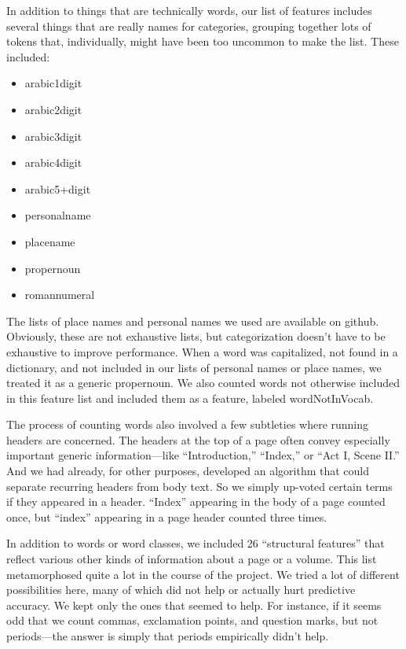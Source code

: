 \documentclass[paper=a4, fontsize=12pt]{scrartcl}
\numberwithin{equation}{section}		%
\numberwithin{figure}{section}			%
\numberwithin{table}{section}				%
\begin{document}
In addition to things that are technically words, our list of features includes several things that are really names for categories, grouping together lots of tokens that, individually, might have been too uncommon to make the list. These included:
\begin{itemize}
\item arabic1digit
\item arabic2digit
\item arabic3digit
\item arabic4digit
\item arabic5+digit
\item personalname
\item placename
\item propernoun
\item romannumeral
\end{itemize}
The lists of place names and personal names we used are available on github. Obviously, these are not exhaustive lists, but categorization doesn't have to be exhaustive to improve performance. When a word was capitalized, not found in a dictionary, and not included in our lists of personal names or place names, we treated it as a generic propernoun. We also counted words not otherwise included in this feature list and included them as a feature, labeled wordNotInVocab.

The process of counting words also involved a few subtleties where running headers are concerned. The headers at the top of a page often convey especially important generic information---like ``Introduction,'' ``Index,'' or ``Act I, Scene II.'' And we had already, for other purposes, developed an algorithm that could separate recurring headers from body text. So we simply up-voted certain terms if they appeared in a header. ``Index'' appearing in the body of a page counted once, but ``index'' appearing in a page header counted three times.

In addition to words or word classes, we included 26 ``structural features'' that reflect various other kinds of information about a page or a volume. This list metamorphosed quite a lot in the course of the project. We tried a lot of different possibilities here, many of which did not help or actually hurt predictive accuracy. We kept only the ones that seemed to help. For instance, if it seems odd that we count commas, exclamation points, and question marks, but not periods---the answer is simply that periods empirically didn't help.
\end{document}
